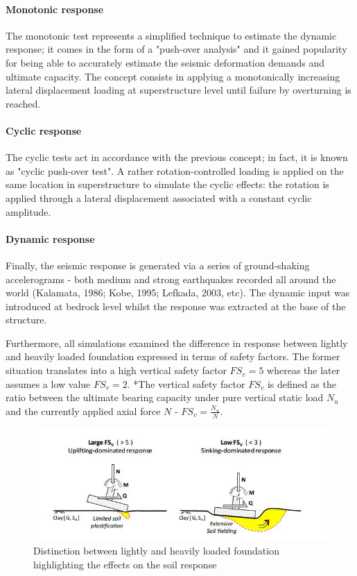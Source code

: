 \documentclass[12pt,a4paper]{report}
\begin{document}
\paragraph{Monotonic response}
The monotonic test represents a simplified technique to estimate the dynamic response; it comes in the form of a "push-over analysis" and it gained popularity for being able to accurately estimate the seismic deformation demands and ultimate capacity. The concept consists in applying a monotonically increasing lateral displacement loading at superstructure level until failure by overturning is reached. 

\paragraph{Cyclic response}
The cyclic tests act in accordance with the previous concept; in fact, it is known as "cyclic push-over test". A rather rotation-controlled loading is applied on the same location in superstructure to simulate the cyclic effects: the rotation is applied through a lateral displacement associated with a constant cyclic amplitude.

\paragraph{Dynamic response}
Finally, the seismic response is generated via a series of ground-shaking accelerograms - both medium and strong earthquakes recorded all around the world (Kalamata, 1986; Kobe, 1995; Lefkada, 2003, etc). The dynamic input was introduced at bedrock level whilst the response was extracted at the base of the structure.

Furthermore, all simulations examined the difference in response between lightly and heavily loaded foundation expressed in terms of safety factors. The former situation translates into a high vertical safety factor $FS_v=5$ whereas the later assumes a low value $FS_v=2$. *The vertical safety factor $FS_v$ is defined as the ratio between the ultimate bearing capacity under pure vertical static load $N_u$ and the currently applied axial force $N$ - $FS_v = \frac{N_u}{N}$. 

\begin{figure}[!h]
	\centering
	\includegraphics[width=0.8\linewidth]{"largeFS"}
	\caption{Distinction between lightly and heavily loaded foundation highlighting the effects on the soil response}
	\label{largeFS}
\end{figure}
\end{document}
